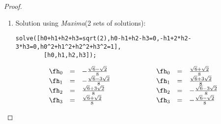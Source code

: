 \begin{proof}
\begin{enumerate}
\item Solution using {\em Maxima}\texttrademark \hspace{1ex}(2 sets of solutions): \\
\begin{lstlisting}[language=MuPAD,frame=single]
  solve([h0+h1+h2+h3=sqrt(2),h0-h1+h2-h3=0,-h1+2*h2-3*h3=0,h0^2+h1^2+h2^2+h3^2=1],
        [h0,h1,h2,h3]);
\end{lstlisting}
\[\begin{array}{rcl}
   \fh_0 &=& -\frac{\sqrt{6}- \sqrt{2}}{8} \\
   \fh_1 &=& -\frac{\sqrt{6}-3\sqrt{2}}{8} \\
   \fh_2 &=&  \frac{\sqrt{6}+3\sqrt{2}}{8} \\
   \fh_3 &=&  \frac{\sqrt{6}+ \sqrt{2}}{8} \\
  \end{array}
  \hspace{2cm}
  \begin{array}{rcl}
   \fh_0 &=&  \frac{\sqrt{6}+ \sqrt{2}}{8} \\
   \fh_1 &=&  \frac{\sqrt{6}+3\sqrt{2}}{8} \\
   \fh_2 &=& -\frac{\sqrt{6}-3\sqrt{2}}{8} \\
   \fh_3 &=& -\frac{\sqrt{6}- \sqrt{2}}{8}
  \end{array}\]
%
%
%
\end{enumerate}
\end{proof}




